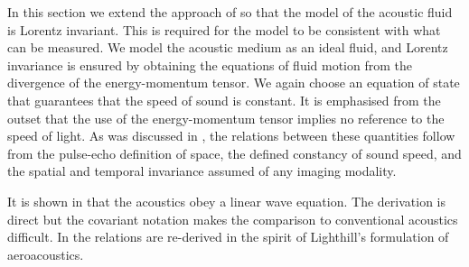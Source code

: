 In this section we extend the approach of  so that the model of the acoustic fluid is Lorentz invariant.
This is required for the model to be consistent with what can be measured.
We model the acoustic medium as an ideal fluid,
and  Lorentz invariance is ensured by obtaining the equations of fluid motion  from the  divergence of the energy-momentum tensor.
We again choose an equation of state that guarantees that the speed of sound is constant.
It is emphasised from the outset that the use of the energy-momentum tensor implies no reference to the speed of light.
As was discussed in , the relations between these quantities follow from the pulse-echo definition of space, the defined constancy of sound speed,
and the spatial and temporal invariance assumed of any imaging modality.  

It is shown in  that the acoustics  obey a linear wave equation.
The derivation is direct but the covariant notation makes the comparison to conventional acoustics difficult.
In  the  relations are re-derived in the spirit of Lighthill's formulation of aeroacoustics.
%
%


